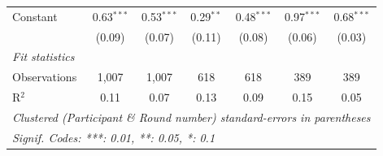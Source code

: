 \begin{tabular}{lcccccc}
   Constant                       & 0.63$^{***}$ & 0.53$^{***}$ & 0.29$^{**}$  & 0.48$^{***}$ & 0.97$^{***}$  & 0.68$^{***}$\\   
                                  & (0.09)       & (0.07)       & (0.11)       & (0.08)       & (0.06)        & (0.03)\\   
   \midrule
   \emph{Fit statistics}\\
   Observations                   & 1,007        & 1,007        & 618          & 618          & 389           & 389\\  
   R$^2$                          & 0.11         & 0.07         & 0.13         & 0.09         & 0.15          & 0.05\\  
   \midrule \midrule
   \multicolumn{7}{l}{\emph{Clustered (Participant \& Round number) standard-errors in parentheses}}\\
   \multicolumn{7}{l}{\emph{Signif. Codes: ***: 0.01, **: 0.05, *: 0.1}}\\
\end{tabular}
\par\endgroup
